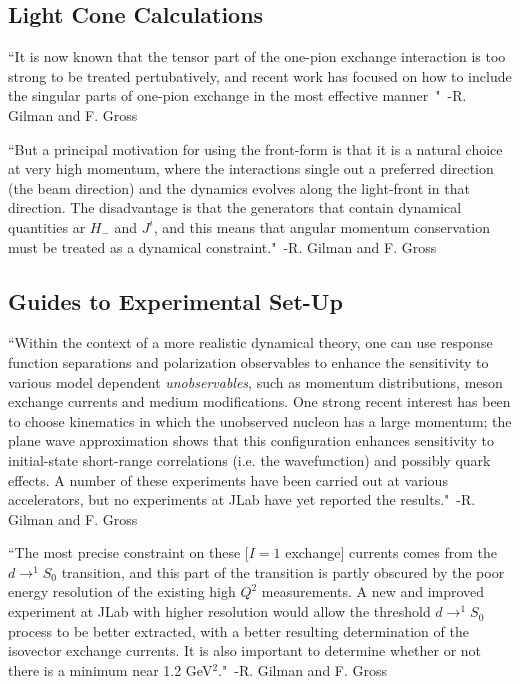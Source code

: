 \subsection{Light Cone Calculations}

``It is now known that the tensor part of the one-pion exchange interaction is too strong to be treated pertubatively, and recent work has focused on how to include the singular parts of one-pion exchange in the most effective manner~\cite{Phillips:1999hh,Phillips:1999am,Walzl:2001vb}"~-R. Gilman and F. Gross~\cite{Gilman:2001yh}

``But a principal motivation for using the front-form is that it is a natural choice at very high momentum, where the interactions single out a preferred direction (the beam direction) and the dynamics evolves along the light-front in that direction. The disadvantage is that the generators that contain dynamical quantities ar $H_{-}$ and $J^i$, and this means that angular momentum conservation must be treated as a dynamical constraint."~-R. Gilman and F. Gross~\cite{Gilman:2001yh}




\subsection{Guides to Experimental Set-Up}

``Within the context of a more realistic dynamical theory, one can use response function separations and polarization observables to enhance the sensitivity to various model dependent \emph{unobservables}, such as momentum distributions, meson exchange currents and medium modifications. One strong recent interest has been to choose kinematics in which the unobserved nucleon has a large momentum; the plane wave approximation shows that this configuration enhances sensitivity to initial-state short-range correlations (i.e. the wavefunction) and possibly quark effects. A number of these experiments have been carried out at various accelerators, but no experiments at JLab have yet reported the results."~-R. Gilman and F. Gross~\cite{Gilman:2001yh}

``The most precise constraint on these [$I=1$ exchange] currents comes from the $d\rightarrow ^1S_0$ transition, and this part of the transition is partly obscured by the poor energy resolution of the existing high $Q^2$ measurements. A new and improved experiment at JLab with higher resolution would allow the threshold $d\rightarrow ^1S_0$ process to be better extracted, with a better resulting determination of the isovector exchange currents. It is also important to determine whether or not there is a minimum near 1.2 GeV$^2$."~-R. Gilman and F. Gross~\cite{Gilman:2001yh}


